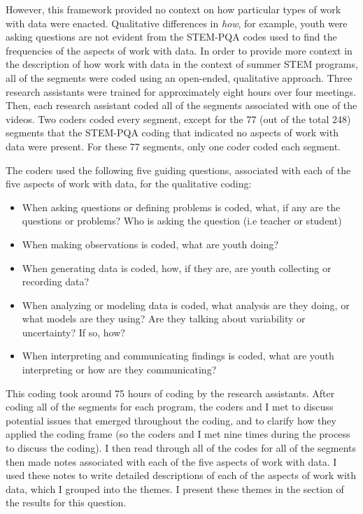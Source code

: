 \documentclass[]{book}
\providecommand{\tightlist}{%
  \setlength{\itemsep}{0pt}\setlength{\parskip}{0pt}}
\theoremstyle{definition}
\theoremstyle{definition}
\theoremstyle{definition}
\theoremstyle{remark}
\begin{document}
However, this framework provided no context on how particular types of
work with data were enacted. Qualitative differences in \emph{how}, for
example, youth were asking questions are not evident from the STEM-PQA
codes used to find the frequencies of the aspects of work with data. In
order to provide more context in the description of how work with data
in the context of summer STEM programs, all of the segments were coded
using an open-ended, qualitative approach. Three research assistants
were trained for approximately eight hours over four meetings. Then,
each research assistant coded all of the segments associated with one of
the videos. Two coders coded every segment, except for the 77 (out of
the total 248) segments that the STEM-PQA coding that indicated no
aspects of work with data were present. For these 77 segments, only one
coder coded each segment.

The coders used the following five guiding questions, associated with
each of the five aspects of work with data, for the qualitative coding:

\begin{itemize}
\tightlist
\item
  When asking questions or defining problems is coded, what, if any are
  the questions or problems? Who is asking the question (i.e teacher or
  student)
\item
  When making observations is coded, what are youth doing?
\item
  When generating data is coded, how, if they are, are youth collecting
  or recording data?
\item
  When analyzing or modeling data is coded, what analysis are they
  doing, or what models are they using? Are they talking about
  variability or uncertainty? If so, how?
\item
  When interpreting and communicating findings is coded, what are youth
  interpreting or how are they communicating?
\end{itemize}

This coding took around 75 hours of coding by the research assistants.
After coding all of the segments for each program, the coders and I met
to discuss potential issues that emerged throughout the coding, and to
clarify how they applied the coding frame (so the coders and I met nine
times during the process to discuss the coding). I then read through all
of the codes for all of the segments then made notes associated with
each of the five aspects of work with data. I used these notes to write
detailed descriptions of each of the aspects of work with data, which I
grouped into the themes. I present these themes in the section of the
results for this question.
\end{document}
